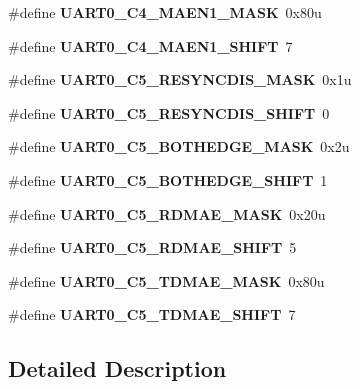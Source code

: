 \begin{DoxyCompactItemize}
$$\item 
\mbox{\label{group___u_a_r_t0___register___masks_ga68a92c3e845ce6ef575114d47d5d447c}} 
\#define {\bfseries U\+A\+R\+T0\+\_\+\+C4\+\_\+\+M\+A\+E\+N1\+\_\+\+M\+A\+SK}~0x80u
\item 
\mbox{\label{group___u_a_r_t0___register___masks_ga799c5f7dd350d4bd89d04167fa771396}} 
\#define {\bfseries U\+A\+R\+T0\+\_\+\+C4\+\_\+\+M\+A\+E\+N1\+\_\+\+S\+H\+I\+FT}~7
\item 
\mbox{\label{group___u_a_r_t0___register___masks_ga6cbc7334e715b4d22547ae185dc63dda}} 
\#define {\bfseries U\+A\+R\+T0\+\_\+\+C5\+\_\+\+R\+E\+S\+Y\+N\+C\+D\+I\+S\+\_\+\+M\+A\+SK}~0x1u
\item 
\mbox{\label{group___u_a_r_t0___register___masks_gaf769ed12082fb9c441d47f5cdf1117e0}} 
\#define {\bfseries U\+A\+R\+T0\+\_\+\+C5\+\_\+\+R\+E\+S\+Y\+N\+C\+D\+I\+S\+\_\+\+S\+H\+I\+FT}~0
\item 
\mbox{\label{group___u_a_r_t0___register___masks_gaa34159b3052095ce96fa50cc6183de77}} 
\#define {\bfseries U\+A\+R\+T0\+\_\+\+C5\+\_\+\+B\+O\+T\+H\+E\+D\+G\+E\+\_\+\+M\+A\+SK}~0x2u
\item 
\mbox{\label{group___u_a_r_t0___register___masks_ga7d1df71b9671df4f50ecb6c1e1518731}} 
\#define {\bfseries U\+A\+R\+T0\+\_\+\+C5\+\_\+\+B\+O\+T\+H\+E\+D\+G\+E\+\_\+\+S\+H\+I\+FT}~1
\item 
\mbox{\label{group___u_a_r_t0___register___masks_ga75704957ea817d0ea4ef69975008dae1}} 
\#define {\bfseries U\+A\+R\+T0\+\_\+\+C5\+\_\+\+R\+D\+M\+A\+E\+\_\+\+M\+A\+SK}~0x20u
\item 
\mbox{\label{group___u_a_r_t0___register___masks_ga5074684d000e97fb534e7e1dc22ea172}} 
\#define {\bfseries U\+A\+R\+T0\+\_\+\+C5\+\_\+\+R\+D\+M\+A\+E\+\_\+\+S\+H\+I\+FT}~5
\item 
\mbox{\label{group___u_a_r_t0___register___masks_ga02899afc667f46e4beecd75e31b0fa90}} 
\#define {\bfseries U\+A\+R\+T0\+\_\+\+C5\+\_\+\+T\+D\+M\+A\+E\+\_\+\+M\+A\+SK}~0x80u
\item 
\mbox{\label{group___u_a_r_t0___register___masks_ga932dfb6ee4de4ff77a7a7d3154718286}} 
\#define {\bfseries U\+A\+R\+T0\+\_\+\+C5\+\_\+\+T\+D\+M\+A\+E\+\_\+\+S\+H\+I\+FT}~7
\end{DoxyCompactItemize}


\subsection{Detailed Description}

